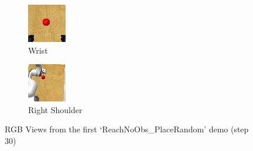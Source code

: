 \begin{figure}[htpb]
\begin{subfigure}{0.3\linewidth}
    \includegraphics[width=0.8\linewidth]{assets/cam-comb/reach-no-obs/demo1-step30-wrist.png}
    \caption{Wrist}\label{subfig:rno-random-wrist}
  \end{subfigure}
  \begin{subfigure}{0.3\linewidth}
    \centering
    \includegraphics[width=0.8\linewidth]{assets/cam-comb/reach-no-obs/demo1-step30-right_shoulder.png}
    \caption{Right Shoulder}\label{subfig:rno-random-rs}
  \end{subfigure}
  \caption{RGB Views from the first `ReachNoObs\_PlaceRandom' demo (step 30)}\label{fig:rno-random-rgb-views}
\end{figure}


